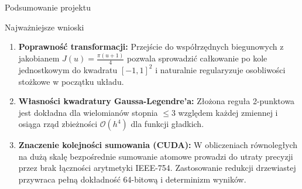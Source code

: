 \documentclass[aspectratio=169, 10pt, xcolor={table}]{beamer}
\begin{document}
\begin{frame}{Podsumowanie projektu}
  \begin{block}{Najważniejsze wnioski}
    \begin{enumerate}
      \item \textbf{Poprawność transformacji:} Przejście do współrzędnych biegunowych z jakobianem $J(u) = \frac{\pi(u+1)}{4}$ pozwala sprowadzić całkowanie po kole jednostkowym do kwadratu $[-1,1]^2$ i naturalnie regularyzuje osobliwości stożkowe w początku układu.
      \item \textbf{Własności kwadratury Gaussa-Legendre'a:} Złożona reguła 2-punktowa jest dokładna dla wielomianów stopnia $\le 3$ względem każdej zmiennej i osiąga rząd zbieżności $\mathcal{O}(h^4)$ dla funkcji gładkich.
      \item \textbf{Znaczenie kolejności sumowania (CUDA):} W obliczeniach równoległych na dużą skalę bezpośrednie sumowanie atomowe prowadzi do utraty precyzji przez brak łączności arytmetyki IEEE-754. Zastosowanie redukcji drzewiastej przywraca pełną dokładność 64-bitową i determinizm wyników.
    \end{enumerate}
  \end{block}
\end{frame}
\end{document}
